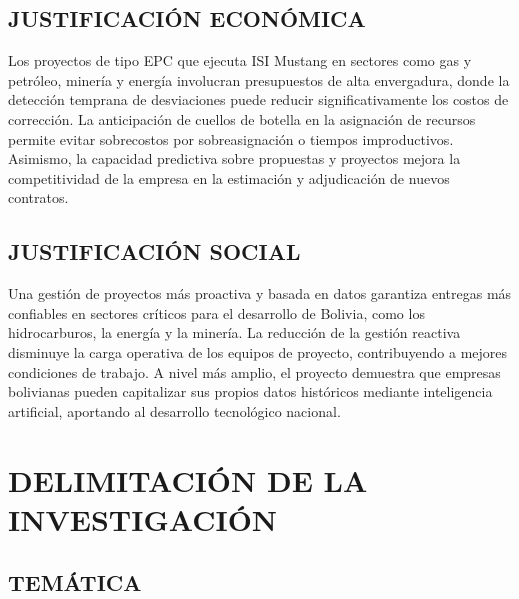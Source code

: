 \documentclass{univalle-perfil}
\begin{document}
\subsection{JUSTIFICACIÓN ECONÓMICA}

Los proyectos de tipo EPC que ejecuta ISI Mustang en sectores como gas y petróleo, minería y energía involucran presupuestos de alta envergadura, donde la detección temprana de desviaciones puede reducir significativamente los costos de corrección. La anticipación de cuellos de botella en la asignación de recursos permite evitar sobrecostos por sobreasignación o tiempos improductivos. Asimismo, la capacidad predictiva sobre propuestas y proyectos mejora la competitividad de la empresa en la estimación y adjudicación de nuevos contratos.

\subsection{JUSTIFICACIÓN SOCIAL}

Una gestión de proyectos más proactiva y basada en datos garantiza entregas más confiables en sectores críticos para el desarrollo de Bolivia, como los hidrocarburos, la energía y la minería. La reducción de la gestión reactiva disminuye la carga operativa de los equipos de proyecto, contribuyendo a mejores condiciones de trabajo. A nivel más amplio, el proyecto demuestra que empresas bolivianas pueden capitalizar sus propios datos históricos mediante inteligencia artificial, aportando al desarrollo tecnológico nacional.

\section{DELIMITACIÓN DE LA INVESTIGACIÓN}

\subsection{TEMÁTICA}
\end{document}
